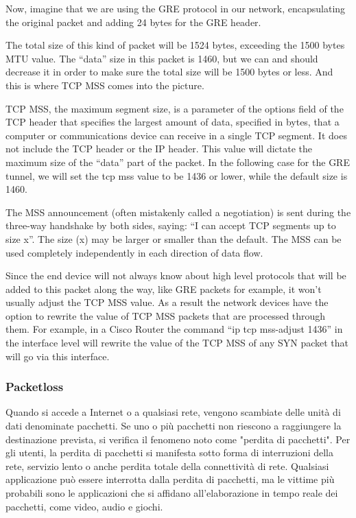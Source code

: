 Now, imagine that we are using the GRE protocol in our network, encapsulating the original packet and adding 24 bytes for the GRE header.

The total size of this kind of packet will be 1524 bytes, exceeding the 1500 bytes MTU value. The “data” size in this packet is 1460, but we can and should decrease it in order to make sure the total size will be 1500 bytes or less. And this is where TCP MSS comes into the picture.

TCP MSS, the maximum segment size, is a parameter of the options field of the TCP header that specifies the largest amount of data, specified in bytes, that a computer or communications device can receive in a single TCP segment. It does not include the TCP header or the IP header. This value will dictate the maximum size of the “data” part of the packet. In the following case for the GRE tunnel, we will set the tcp mss value to be 1436 or lower, while the default size is 1460.

The MSS announcement (often mistakenly called a negotiation) is sent during the three-way handshake by both sides, saying: “I can accept TCP segments up to size x”. The size (x) may be larger or smaller than the default. The MSS can be used completely independently in each direction of data flow.

Since the end device will not always know about high level protocols that will be added to this packet along the way, like GRE packets for example, it won’t usually adjust the TCP MSS value. As a result the network devices have the option to rewrite the value of TCP MSS packets that are processed through them. For example, in a Cisco Router the command “ip tcp mss-adjust 1436” in the interface level will rewrite the value of the TCP MSS of any SYN packet that will go via this interface.



\subsubsection{Packetloss}
Quando si accede a Internet o a qualsiasi rete, vengono scambiate delle unità di dati denominate pacchetti. Se uno o più pacchetti non riescono a raggiungere la destinazione prevista, si verifica il fenomeno noto come "perdita di pacchetti". Per gli utenti, la perdita di pacchetti si manifesta sotto forma di interruzioni della rete, servizio lento o anche perdita totale della connettività di rete. Qualsiasi applicazione può essere interrotta dalla perdita di pacchetti, ma le vittime più probabili sono le applicazioni che si affidano all’elaborazione in tempo reale dei pacchetti, come video, audio e giochi.

